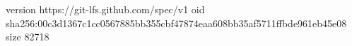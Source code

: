 version https://git-lfs.github.com/spec/v1
oid sha256:00c3d1367c1cc0567885bb355cbf47874eaa608bb35af5711ffbde961eb45e08
size 82718
